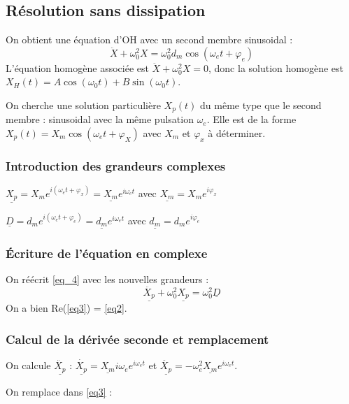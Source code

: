 \documentclass[french]{yLectureNote}
\begin{document}
\subsection{Résolution sans dissipation}
On obtient une équation d'OH avec un second membre sinusoidal :
\begin{equation}
 \ddot{X} + \omega_0^2X = \omega_0^2 d_m \cos(\omega_e t + \varphi_e)\label{eq2}
\end{equation}
L'équation homogène associée est $\ddot{X} + \omega_0^2X = 0$, donc la solution homogène est $X_H(t) = A\cos(\omega_0 t) + B\sin(\omega_0 t)$.

On cherche une solution particulière $X_p(t)$ du m\^eme type que le second membre : sinusoidal avec la m\^eme pulsation $\omega_e$. Elle est de la forme $X_p(t) = X_m \cos(\omega_e t + \varphi_X)$ avec $X_m$ et $\varphi_x$ à déterminer.

\subsubsection{Introduction des grandeurs complexes}

$\underline{X_p} = X_me^{i(\omega_e t + \varphi_x)} = \underline{X_m} e^{i\omega_e t}$ avec $\underline{X_m} =  X_me^{i\varphi_x}$

$\underline{D} = d_m e^{i(\omega_e t + \varphi_e)} = \underline{d_m} e^{i\omega_e t} $ avec $\underline{d_m} = d_m e^{i\varphi_e}$

\subsubsection{Écriture de l'équation en complexe}
On réécrit \eqref{eq_4} avec les nouvelles grandeurs :
\begin{equation}
 \ddot{\underline{X_p}} + \omega_0^2 \underline{X_p} = \omega_0^2 \underline{D}\label{eq3}
\end{equation}
On a bien Re(\eqref{eq3}) = \eqref{eq2}.
\subsubsection{Calcul de la dérivée seconde et remplacement}
On calcule $\ddot{\underline{X_p}}$ :
$\dot{\underline{X_p}} = \underline{X_m} i\omega_e e^{i\omega_e t}$ et $\ddot{\underline{X_p}} = -\omega_e^2 \underline{X_m} e^{i\omega_e t}$.

On remplace dans \eqref{eq3} :
\end{document}
